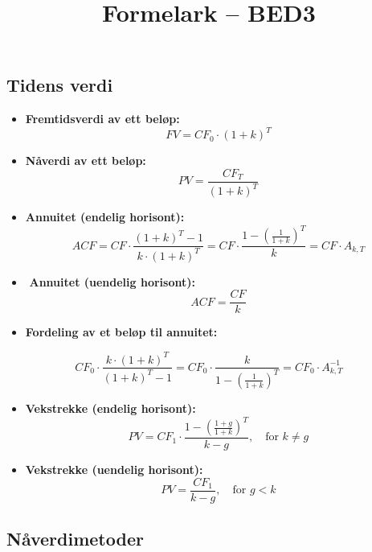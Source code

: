 \documentclass[
  11pt,
  a4paper,
]{article}
\title{Formelark -- BED3}
\author{}
\date{}
\renewcommand*\contentsname{Table of contents}
\newcommand\contentsname{Table of contents}
\begin{document}
\maketitle

\renewcommand*\contentsname{Table of contents}
{
\hypersetup{linkcolor=}
\setcounter{tocdepth}{2}
\tableofcontents
}

\subsection{Tidens verdi}\label{tidens-verdi}

\begin{itemize}
\item
  \textbf{Fremtidsverdi av ett beløp:}\\
  \[
  FV = CF_0 \cdot (1 + k)^T
  \]
\item
  \textbf{Nåverdi av ett beløp:}\\
  \[
  PV = \frac{CF_T}{(1 + k)^T}
  \]
\item
  \textbf{Annuitet (endelig horisont):}\\
  \[
  ACF = CF \cdot \frac{(1 + k)^T -1}{k \cdot (1 + k)^T} = CF \cdot \frac{1- \left(\frac{1}{1 +k}\right)^T}{k} = CF \cdot A_{k,T}
  \]
\item
  ️ \textbf{Annuitet (uendelig horisont):}\\
  \[
  ACF =  \frac{CF}{k}
  \]
\item
  \textbf{Fordeling av et beløp til annuitet:}
\end{itemize}

\[
CF_0 \cdot \frac{k\cdot (1 + k)^T}{(1 + k)^T - 1} = CF_{0} \cdot \frac{k}{1-\left(\frac{1}{1 + k}\right)^T} = CF_{0} \cdot A_{k,T}^{-1}
\]

\begin{itemize}
\item
  \textbf{Vekstrekke (endelig horisont):}\\
  \[
  PV = CF_1 \cdot \frac{1 - \left( \frac{1 + g}{1 + k} \right)^T}{k - g}, \quad \text{for } k \neq g
  \]
\item
  \textbf{Vekstrekke (uendelig horisont):}\\
  \[
  PV = \frac{CF_1}{k - g}, \quad \text{for } g < k
  \]
\end{itemize}

\subsection{Nåverdimetoder}\label{nuxe5verdimetoder}
\end{document}
